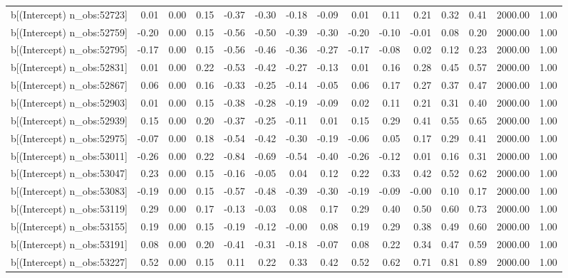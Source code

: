 \begin{table}[ht]
\begin{tabular}{rrrrrrrrrrrrrrr}
  b[(Intercept) n\_obs:52723] & 0.01 & 0.00 & 0.15 & -0.37 & -0.30 & -0.18 & -0.09 & 0.01 & 0.11 & 0.21 & 0.32 & 0.41 & 2000.00 & 1.00 \\ 
  b[(Intercept) n\_obs:52759] & -0.20 & 0.00 & 0.15 & -0.56 & -0.50 & -0.39 & -0.30 & -0.20 & -0.10 & -0.01 & 0.08 & 0.20 & 2000.00 & 1.00 \\ 
  b[(Intercept) n\_obs:52795] & -0.17 & 0.00 & 0.15 & -0.56 & -0.46 & -0.36 & -0.27 & -0.17 & -0.08 & 0.02 & 0.12 & 0.23 & 2000.00 & 1.00 \\ 
  b[(Intercept) n\_obs:52831] & 0.01 & 0.00 & 0.22 & -0.53 & -0.42 & -0.27 & -0.13 & 0.01 & 0.16 & 0.28 & 0.45 & 0.57 & 2000.00 & 1.00 \\ 
  b[(Intercept) n\_obs:52867] & 0.06 & 0.00 & 0.16 & -0.33 & -0.25 & -0.14 & -0.05 & 0.06 & 0.17 & 0.27 & 0.37 & 0.47 & 2000.00 & 1.00 \\ 
  b[(Intercept) n\_obs:52903] & 0.01 & 0.00 & 0.15 & -0.38 & -0.28 & -0.19 & -0.09 & 0.02 & 0.11 & 0.21 & 0.31 & 0.40 & 2000.00 & 1.00 \\ 
  b[(Intercept) n\_obs:52939] & 0.15 & 0.00 & 0.20 & -0.37 & -0.25 & -0.11 & 0.01 & 0.15 & 0.29 & 0.41 & 0.55 & 0.65 & 2000.00 & 1.00 \\ 
  b[(Intercept) n\_obs:52975] & -0.07 & 0.00 & 0.18 & -0.54 & -0.42 & -0.30 & -0.19 & -0.06 & 0.05 & 0.17 & 0.29 & 0.41 & 2000.00 & 1.00 \\ 
  b[(Intercept) n\_obs:53011] & -0.26 & 0.00 & 0.22 & -0.84 & -0.69 & -0.54 & -0.40 & -0.26 & -0.12 & 0.01 & 0.16 & 0.31 & 2000.00 & 1.00 \\ 
  b[(Intercept) n\_obs:53047] & 0.23 & 0.00 & 0.15 & -0.16 & -0.05 & 0.04 & 0.12 & 0.22 & 0.33 & 0.42 & 0.52 & 0.62 & 2000.00 & 1.00 \\ 
  b[(Intercept) n\_obs:53083] & -0.19 & 0.00 & 0.15 & -0.57 & -0.48 & -0.39 & -0.30 & -0.19 & -0.09 & -0.00 & 0.10 & 0.17 & 2000.00 & 1.00 \\ 
  b[(Intercept) n\_obs:53119] & 0.29 & 0.00 & 0.17 & -0.13 & -0.03 & 0.08 & 0.17 & 0.29 & 0.40 & 0.50 & 0.60 & 0.73 & 2000.00 & 1.00 \\ 
  b[(Intercept) n\_obs:53155] & 0.19 & 0.00 & 0.15 & -0.19 & -0.12 & -0.00 & 0.08 & 0.19 & 0.29 & 0.38 & 0.49 & 0.60 & 2000.00 & 1.00 \\ 
  b[(Intercept) n\_obs:53191] & 0.08 & 0.00 & 0.20 & -0.41 & -0.31 & -0.18 & -0.07 & 0.08 & 0.22 & 0.34 & 0.47 & 0.59 & 2000.00 & 1.00 \\ 
  b[(Intercept) n\_obs:53227] & 0.52 & 0.00 & 0.15 & 0.11 & 0.22 & 0.33 & 0.42 & 0.52 & 0.62 & 0.71 & 0.81 & 0.89 & 2000.00 & 1.00 \\ 

\end{tabular}
\end{table}
